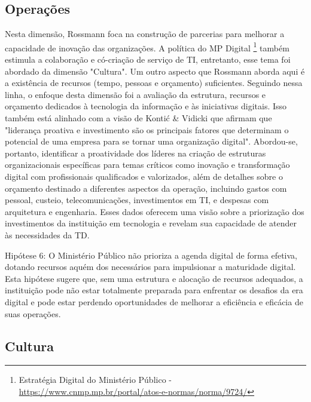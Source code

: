 \subsection{Operações}

Nesta dimensão, Rossmann \cite{rossmann2018digital} foca na construção de parcerias para melhorar a capacidade de inovação das organizações. A política do MP Digital \footnote{Estratégia Digital do Ministério Público - \url{https://www.cnmp.mp.br/portal/atos-e-normas/norma/9724/}} também estimula a colaboração e có-criação de serviço de TI, entretanto, esse tema foi abordado da dimensão "Cultura". Um outro aspecto que Rossmann \cite{rossmann2018digital} aborda aqui é a existência de recursos (tempo, pessoas e orçamento) suficientes. Seguindo nessa linha, o enfoque desta dimensão foi a avaliação da estrutura, recursos e orçamento dedicados à tecnologia da informação e às iniciativas digitais. Isso também está alinhado com a visão de Kontić \& Vidicki \cite{kontic2018strategy} que afirmam que "liderança proativa e investimento são os principais fatores que determinam o potencial de uma empresa para se tornar uma organização digital". Abordou-se, portanto, identificar a proatividade dos líderes na criação de estruturas organizacionais específicas para temas críticos como inovação e transformação digital com profissionais qualificados e valorizados, além de detalhes sobre o orçamento destinado a diferentes aspectos da operação, incluindo gastos com pessoal, custeio, telecomunicações, investimentos em TI, e despesas com arquitetura e engenharia. Esses dados oferecem uma visão sobre a priorização dos investimentos da instituição em tecnologia e revelam sua capacidade de atender às necessidades da TD.

Hipótese 6: O Ministério Público não prioriza a agenda digital de forma efetiva, dotando recursos aquém dos necessários para impulsionar a maturidade digital. Esta hipótese sugere que, sem uma estrutura e alocação de recursos adequados, a instituição pode não estar totalmente preparada para enfrentar os desafios da era digital e pode estar perdendo oportunidades de melhorar a eficiência e eficácia de suas operações.


\subsection{Cultura}

